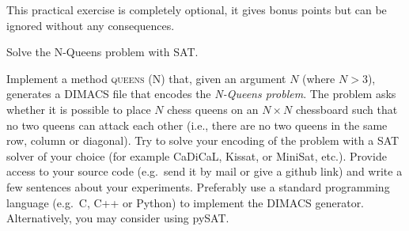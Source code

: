 \documentclass[addpoints,12pt]{exam}
\begin{document}
\begin{questions}
\newpage


\bonusquestion[15]
\vspace*{5pt}

This practical exercise is completely optional, it gives bonus points but can be ignored without any consequences.

Solve the N-Queens problem with SAT. 

Implement a method \textsc{queens (N)} that, given an argument $N$ (where $N>3$), generates a DIMACS file that
encodes the \textit{N-Queens problem}.
The problem asks whether it is possible to place $N$ chess queens on an $N \times N$ chessboard such
that no two queens can attack each other (i.e., there are no two queens in the same row, column or
diagonal).
Try to solve your encoding of the problem with a SAT solver of your choice (for example CaDiCaL, Kissat, or MiniSat, etc.).
Provide access to your source code (e.g.~send it by mail or give a github link) and write a few sentences about your experiments.
Preferably use a standard programming language (e.g.~C, C++ or Python) to implement the DIMACS generator.
Alternatively, you may consider using pySAT.

\end{questions}
\end{document}
